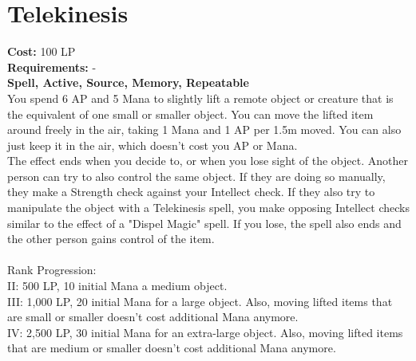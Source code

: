 \section{Telekinesis}\label{spell:telekinesis}
\textbf{Cost:} 100 LP\\
\textbf{Requirements:} -\\
\textbf{Spell, Active, Source, Memory, Repeatable}\\
You spend 6 AP and 5 Mana to slightly lift a remote object or creature that is the equivalent of one small or smaller object.
You can move the lifted item around freely in the air, taking 1 Mana and 1 AP per 1.5m moved.
You can also just keep it in the air, which doesn't cost you AP or Mana.\\
The effect ends when you decide to, or when you lose sight of the object.
Another person can try to also control the same object.
If they are doing so manually, they make a Strength check against your Intellect check.
If they also try to manipulate the object with a Telekinesis spell, you make opposing Intellect checks similar to the effect of a "Dispel Magic" spell.
If you lose, the spell also ends and the other person gains control of the item.\\
\\
Rank Progression:\\
II: 500 LP, 10 initial Mana a medium object.\\

III: 1,000 LP, 20 initial Mana for a large object.
Also, moving lifted items that are small or smaller doesn't cost additional Mana anymore.\\

IV: 2,500 LP, 30 initial Mana for an extra-large object.
Also, moving lifted items that are medium or smaller doesn't cost additional Mana anymore.